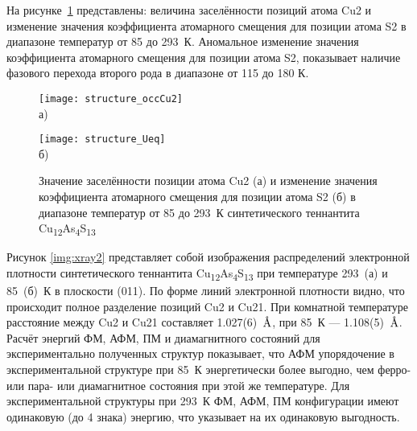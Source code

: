 На рисунке~\ref{img:xray} представлены: величина заселённости позиций атома Cu2 и изменение значения коэффициента атомарного смещения для позиции атома S2 в диапазоне температур от 85 до 293~К. Аномальное изменение значения коэффициента атомарного смещения для позиции атома S2, показывает наличие фазового перехода второго рода в диапазоне от 115 до 180 К.

\begin{figure}[ht]
  \begin{minipage}[ht]{0.5\linewidth}\centering
    \texttt{[image: structure\_occCu2]} \\ а)
  \end{minipage}
  \hfill
  \begin{minipage}[ht]{0.5\linewidth}\centering
    \texttt{[image: structure\_Ueq]} \\ б)
  \end{minipage}

      \caption[Значение заселённости позиции атома Cu2 (а) и изменение значения коэффициента атомарного смещения для позиции атома S2 (б) в диапазоне температур от 85 до 293~К синтетического теннантита Cu\textsubscript{12}As\textsubscript{4}S\textsubscript{13}]{Значение заселённости позиции атома Cu2 (а) и изменение значения коэффициента атомарного смещения для позиции атома S2 (б) в диапазоне температур от 85 до 293~К синтетического теннантита Cu\textsubscript{12}As\textsubscript{4}S\textsubscript{13}}
    \label{img:xray}
\end{figure}

Рисунок \ref{img:xray2} представляет собой изображения распределений электронной плотности синтетического теннантита Cu\textsubscript{12}As\textsubscript{4}S\textsubscript{13} при температуре 293~(а) и 85~(б)~К в плоскости (011). По форме линий электронной плотности видно, что происходит полное разделение позиций Cu2 и Cu21. При комнатной температуре расстояние между Cu2 и Cu21 составляет 1.027(6)~$\mbox{\normalfont\AA}$, при 85~К --- 1.108(5)~$\mbox{\normalfont\AA}$. Расчёт энергий ФМ, АФМ, ПМ и диамагнитного состояний для экспериментально полученных структур показывает, что АФМ упорядочение в экспериментальной структуре при 85~К энергетически более выгодно, чем ферро- или пара- или диамагнитное состояния при этой же температуре. Для экспериментальной структуры при 293~К ФМ, АФМ, ПМ конфигурации имеют одинаковую (до 4 знака) энергию, что указывает на их одинаковую выгодность.

